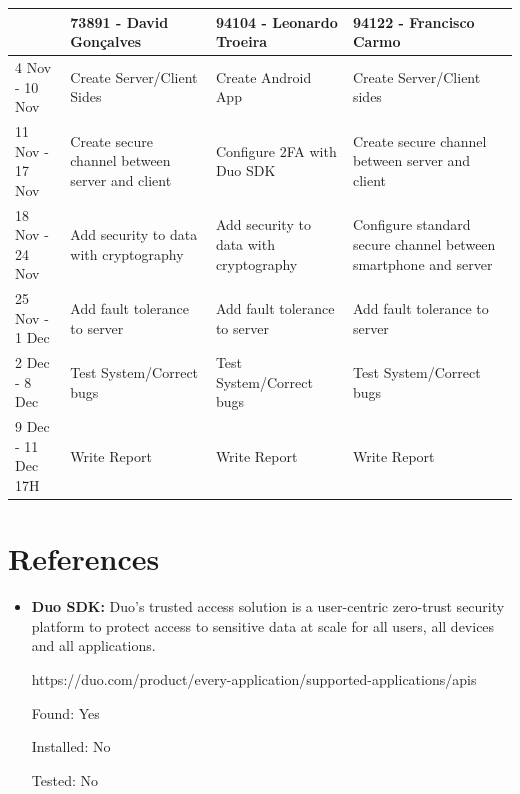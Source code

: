 \documentclass[12pt]{article}
\begin{document}
\begin{table}[h]
\footnotesize
\begin{tabular}{@{}p{1cm}|p{4cm}|p{4cm}|p{4cm}|@{}}
\cmidrule(l){2-4}
 & 73891 - David Gonçalves & 94104 - Leonardo Troeira & 94122 - Francisco Carmo \\ \midrule
\multicolumn{1}{|l|}{4 Nov - 10 Nov} & Create Server/Client Sides & Create Android App & Create Server/Client sides \\ \midrule
\multicolumn{1}{|l|}{11 Nov - 17 Nov} & Create secure channel between server and client & Configure 2FA with Duo SDK & Create secure channel between server and client \\ \midrule
\multicolumn{1}{|l|}{18 Nov - 24 Nov} & Add security to data with cryptography & Add security to data with cryptography & Configure standard secure channel between smartphone and server \\ \midrule
\multicolumn{1}{|l|}{25 Nov - 1 Dec} & Add fault tolerance to server & Add fault tolerance to server & Add fault tolerance to server \\ \midrule
\multicolumn{1}{|l|}{2 Dec - 8 Dec} & Test System/Correct bugs & Test System/Correct bugs & Test System/Correct bugs \\ \midrule
\multicolumn{1}{|l|}{9 Dec - 11 Dec 17H} & Write Report & Write Report & Write Report \\ \bottomrule
\end{tabular}
\end{table}



\newpage
\section{References}

\begin{itemize}
  \item \textbf{Duo SDK:} Duo's trusted access solution is a user-centric zero-trust security platform to protect access to sensitive data at scale for all users, all devices and all applications.\par https://duo.com/product/every-application/supported-applications/apis\par
  Found: Yes\par
  Installed: No\par
  Tested: No\par
\end{itemize}
\end{document}
